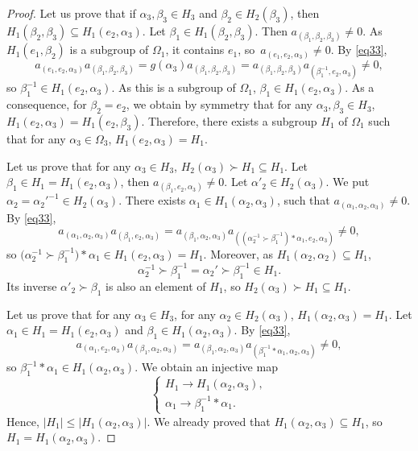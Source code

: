 \documentclass[pdftex]{sigma}
\numberwithin{equation}{section}
\begin{document}
\begin{proof}
Let us prove that if $\alpha_3,\beta_3\in H_3$ and $\beta_2\in H_2(\beta_3)$, then $H_1(\beta_2,\beta_3)\subseteq H_1(e_2,\alpha_3)$. Let $\beta_1\in H_1(\beta_2,\beta_3)$.
Then $a_{(\beta_1,\beta_2,\beta_3)}\neq 0$. As $H_1(e_1,\beta_2)$ is a subgroup of $\Omega_1$, it contains $e_1$, so~${a_{(e_1,e_2,\alpha_3)}\neq 0}$. By \eqref{eq33},
\[a_{(e_1,e_2,\alpha_3)}a_{(\beta_1,\beta_2,\beta_3)}=g(\alpha_3)a_{(\beta_1,\beta_2,\beta_3)}=a_{(\beta_1,\beta_2,\beta_3)}a_{(\beta_1^{-1},e_2,\alpha_3)}\neq 0,\]
so $\beta_1^{-1}\in H_1(e_2,\alpha_3)$. As this is a subgroup of $\Omega_1$, $\beta_1\in H_1(e_2,\alpha_3)$.
As a consequence, for $\beta_2=e_2$, we obtain by symmetry that for any $\alpha_3,\beta_3\in H_3$, $H_1(e_2,\alpha_3)=H_1(e_2,\beta_3)$.
Therefore, there exists a subgroup $H_1$ of $\Omega_1$ such that for any $\alpha_3\in \Omega_3$, $H_1(e_2,\alpha_3)=H_1$.

Let us prove that for any $\alpha_3\in H_3$, $H_2(\alpha_3)\succ H_1\subseteq H_1$. Let $\beta_1\in H_1=H_1(e_2,\alpha_3)$, then $a_{(\beta_1,e_2,\alpha_3)}\neq 0$. Let $\alpha'_2\in H_2(\alpha_3)$.
We put $\alpha_2=\alpha_2'^{-1}\in H_2(\alpha_3)$. There exists $\alpha_1\in H_1(\alpha_2,\alpha_3)$, such that $a_{(\alpha_1,\alpha_2,\alpha_3)}\neq 0$. By \eqref{eq33},
 \[a_{(\alpha_1,\alpha_2,\alpha_3)}a_{(\beta_1,e_2,\alpha_3)}=a_{(\beta_1,\alpha_2,\alpha_3)}a_{((\alpha_2^{-1}\succ \beta_1^{-1})*\alpha_1,e_2,\alpha_3)}\neq 0,\]
so $\bigl(\alpha_2^{-1}\succ \beta_1^{-1}\bigr)*\alpha_1\in H_1(e_2,\alpha_3)=H_1$. Moreover, as $H_1(\alpha_2,\alpha_2)\subseteq H_1$,
\[\alpha_2^{-1}\succ \beta_1^{-1}=\alpha_2'\succ \beta_1^{-1}\in H_1.\]
Its inverse $ \alpha'_2\succ \beta_1$ is also an element of $H_1$, so $H_2(\alpha_3)\succ H_1\subseteq H_1$.

Let us prove that for any $\alpha_3\in H_3$, for any $\alpha_2\in H_2(\alpha_3)$, $H_1(\alpha_2,\alpha_3)=H_1$. Let $\alpha_1\in H_1=H_1(e_2,\alpha_3)$ and $\beta_1\in H_1(\alpha_2,\alpha_3)$. By \eqref{eq33},
\[a_{(\alpha_1,e_2,\alpha_3)}a_{(\beta_1,\alpha_2,\alpha_3)}=a_{(\beta_1,\alpha_2,\alpha_3)}a_{(\beta_1^{-1}*\alpha_1,\alpha_2,\alpha_3)}\neq 0,\]
so $\beta_1^{-1}*\alpha_1\in H_1(\alpha_2,\alpha_3)$. We obtain an injective map
\[\begin{cases}
H_1 \longrightarrow H_1(\alpha_2,\alpha_3),\\
\alpha_1 \longrightarrow \beta_1^{-1}*\alpha_1.
\end{cases}\]
Hence, $|H_1|\leqslant |H_1(\alpha_2,\alpha_3)|$. We already proved that $H_1(\alpha_2,\alpha_3)\subseteq H_1$, so $H_1=H_1(\alpha_2,\alpha_3)$.


\end{proof}
\end{document}
